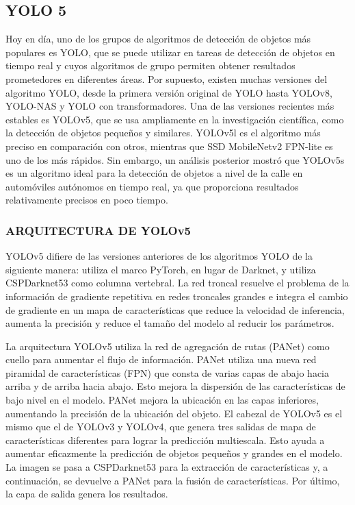 \subsection{YOLO 5}
Hoy en día, uno de los grupos de algoritmos de detección de objetos más populares es YOLO, que se puede utilizar en tareas de detección de objetos en tiempo real y cuyos algoritmos de grupo permiten obtener resultados prometedores en diferentes áreas. Por supuesto, existen muchas versiones del algoritmo YOLO, desde la primera versión original de YOLO hasta YOLOv8, YOLO-NAS y YOLO con transformadores. Una de las versiones recientes más estables es YOLOv5, que se usa ampliamente en la investigación científica, como la detección de objetos pequeños y similares. YOLOv5l es el algoritmo más preciso en comparación con otros, mientras que SSD MobileNetv2 FPN-lite es uno de los más rápidos. Sin embargo, un análisis posterior mostró que YOLOv5s es un algoritmo ideal para la detección de objetos a nivel de la calle en automóviles autónomos en tiempo real, ya que proporciona resultados relativamente precisos en poco tiempo.

\subsubsection{ARQUITECTURA DE YOLOv5}

YOLOv5 difiere de las versiones anteriores de los algoritmos YOLO de la siguiente manera: utiliza el marco PyTorch, en lugar de Darknet, y utiliza CSPDarknet53 como columna vertebral. La red troncal resuelve el problema de la información de gradiente repetitiva en redes troncales grandes e integra el cambio de gradiente en un mapa de características que reduce la velocidad de inferencia, aumenta la precisión y reduce el tamaño del modelo al reducir los parámetros. 

La arquitectura YOLOv5 utiliza la red de agregación de rutas (PANet) como cuello para aumentar el flujo de información. PANet utiliza una nueva red piramidal de características (FPN) que consta de varias capas de abajo hacia arriba y de arriba hacia abajo. Esto mejora la dispersión de las características de bajo nivel en el modelo. PANet mejora la ubicación en las capas inferiores, aumentando la precisión de la ubicación del objeto. El cabezal de YOLOv5 es el mismo que el de YOLOv3 y YOLOv4, que genera tres salidas de mapa de características diferentes para lograr la predicción multiescala. Esto ayuda a aumentar eficazmente la predicción de objetos pequeños y grandes en el modelo. La imagen se pasa a CSPDarknet53 para la extracción de características y, a continuación, se devuelve a PANet para la fusión de características. Por último, la capa de salida genera los resultados.

